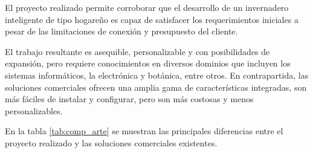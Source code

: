 El proyecto realizado permite corroborar que el desarrollo de un invernadero inteligente de tipo hogareño es capaz de satisfacer los requerimientos iniciales a pesar de las limitaciones de conexión y presupuesto del cliente.   


El trabajo resultante es asequible, personalizable y con posibilidades de expansión, pero requiere conocimientos en diversos dominios que incluyen los sistemas informáticos, la electrónica y botánica, entre otros. En contrapartida, las soluciones comerciales ofrecen una amplia gama de características integradas, son más fáciles de instalar y configurar, pero son más costosas y menos personalizables.

En la tabla \ref{tab:comp_arte} se muestran las principales diferencias entre el proyecto realizado y las soluciones comerciales existentes.


%
%

